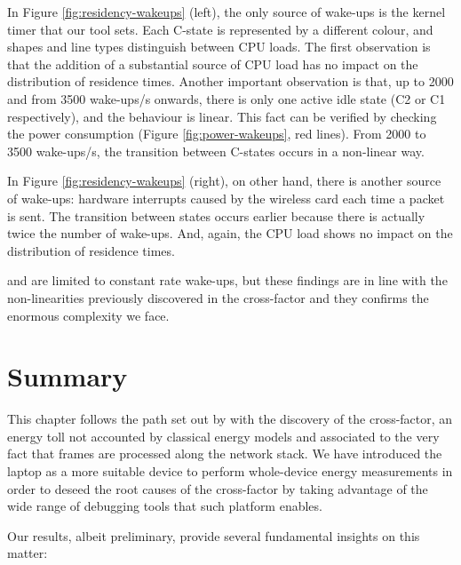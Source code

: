 \documentclass[twoside,nohyper]{tufte-book}
\theoremstyle{definition}
\theoremstyle{definition}
\theoremstyle{definition}
\theoremstyle{remark}
\begin{document}
In Figure \ref{fig:residency-wakeups} (left), the only source of
wake-ups is the kernel timer that our tool sets. Each C-state is
represented by a different colour, and shapes and line types distinguish
between CPU loads. The first observation is that the addition of a
substantial source of CPU load has no impact on the distribution of
residence times. Another important observation is that, up to 2000 and
from 3500 wake-ups/s onwards, there is only one active idle state (C2 or
C1 respectively), and the behaviour is linear. This fact can be verified
by checking the power consumption (Figure \ref{fig:power-wakeups}, red
lines). From 2000 to 3500 wake-ups/s, the transition between C-states
occurs in a non-linear way.

In Figure \ref{fig:residency-wakeups} (right), on other hand, there is
another source of wake-ups: hardware interrupts caused by the wireless
card each time a packet is sent. The transition between states occurs
earlier because there is actually twice the number of wake-ups. And,
again, the CPU load shows no impact on the distribution of residence
times.

 and are limited to constant rate
wake-ups, but these findings are in line with the non-linearities
previously discovered in the cross-factor and they confirms the enormous
complexity we face.

\section{Summary}\label{summary-1}

This chapter follows the path set out by \citet{Serrano2014} with the
discovery of the cross-factor, an energy toll not accounted by classical
energy models and associated to the very fact that frames are processed
along the network stack. We have introduced the laptop as a more
suitable device to perform whole-device energy measurements in order to
deseed the root causes of the cross-factor by taking advantage of the
wide range of debugging tools that such platform enables.

Our
results\cite[0pt]{contrib-04a,contrib-04b},
albeit preliminary, provide several fundamental insights on this matter:
\end{document}
